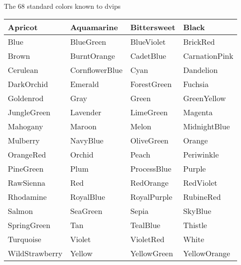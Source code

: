 \documentclass[11pt]{article}
\begin{document}
\begin{center}\large
The 68 standard colors known to dvips\vspace{0.5ex}
\begin{tabular}{|l|l|l|l|}
\hline
{\color{Apricot} Apricot}&
{\color{Aquamarine} Aquamarine}&
{\color{Bittersweet} Bittersweet}&
{\color{Black} Black}\\ \hline
{\color{Blue} Blue}&
{\color{BlueGreen} BlueGreen}&
{\color{BlueViolet} BlueViolet}&
{\color{BrickRed} BrickRed}\\ \hline
{\color{Brown} Brown}&
{\color{BurntOrange} BurntOrange}&
{\color{CadetBlue} CadetBlue}&
{\color{CarnationPink} CarnationPink}\\ \hline
{\color{Cerulean} Cerulean}&
{\color{CornflowerBlue} CornflowerBlue}&
{\color{Cyan} Cyan}&
{\color{Dandelion} Dandelion}\\ \hline
{\color{DarkOrchid} DarkOrchid}&
{\color{Emerald} Emerald}&
{\color{ForestGreen} ForestGreen}&
{\color{Fuchsia} Fuchsia}\\ \hline
{\color{Goldenrod} Goldenrod}&
{\color{Gray} Gray}&
{\color{Green} Green}&
{\color{GreenYellow} GreenYellow}\\ \hline
{\color{JungleGreen} JungleGreen}&
{\color{Lavender} Lavender}&
{\color{LimeGreen} LimeGreen}&
{\color{Magenta} Magenta}\\ \hline
{\color{Mahogany} Mahogany}&
{\color{Maroon} Maroon}&
{\color{Melon} Melon}&
{\color{MidnightBlue} MidnightBlue}\\ \hline
{\color{Mulberry} Mulberry}&
{\color{NavyBlue} NavyBlue}&
{\color{OliveGreen} OliveGreen}&
{\color{Orange} Orange}\\ \hline
{\color{OrangeRed} OrangeRed}&
{\color{Orchid} Orchid}&
{\color{Peach} Peach}&
{\color{Periwinkle} Periwinkle}\\ \hline
{\color{PineGreen} PineGreen}&
{\color{Plum} Plum}&
{\color{ProcessBlue} ProcessBlue}&
{\color{Purple} Purple}\\ \hline
{\color{RawSienna} RawSienna}&
{\color{Red} Red}&
{\color{RedOrange} RedOrange}&
{\color{RedViolet} RedViolet}\\ \hline
{\color{Rhodamine} Rhodamine}&
{\color{RoyalBlue} RoyalBlue}&
{\color{RoyalPurple} RoyalPurple}&
{\color{RubineRed} RubineRed}\\ \hline
{\color{Salmon} Salmon}&
{\color{SeaGreen} SeaGreen}&
{\color{Sepia} Sepia}&
{\color{SkyBlue} SkyBlue}\\ \hline
{\color{SpringGreen} SpringGreen}&
{\color{Tan} Tan}&
{\color{TealBlue} TealBlue}&
{\color{Thistle} Thistle}\\ \hline
{\color{Turquoise} Turquoise}&
{\color{Violet} Violet}&
{\color{VioletRed} VioletRed}&
{\color{White} White}\\ \hline
{\color{WildStrawberry} WildStrawberry}&
{\color{Yellow} Yellow}&
{\color{YellowGreen} YellowGreen}&
{\color{YellowOrange} YellowOrange}\\ \hline
\end{tabular}
\end{center}
\end{document}
